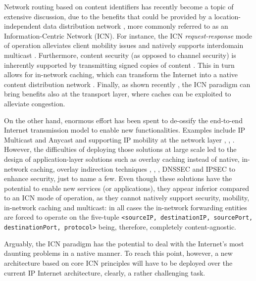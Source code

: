 \documentclass{sig-alternate}
\begin{document}
Network routing based on content identifiers has recently become a topic of extensive discussion, due to the benefits that could be provided by a location-independent data distribution network \cite{surveyICN}, more commonly referred to as an Information-Centric Network (ICN).
For instance, the ICN \textit{request-response} mode of operation alleviates client mobility issues \cite{garethMobility} and natively supports interdomain multicast \cite{SarelaBFInfocom}. 
Furthermore, content security (as opposed to channel security) is inherently supported by transmitting signed copies of content \cite{ccn}.
This in turn allows for in-network caching, which can transform the Internet into a native content distribution network \cite{cachingSurvey}.
Finally, as shown recently \cite{inrpp-hotnets-ipsaras}, the ICN paradigm can bring benefits also at the transport layer, where caches can be exploited to alleviate congestion.

On the other hand, enormous effort has been spent to de-ossify the end-to-end Internet transmission model to enable new functionalities.
Examples include IP Multicast and Anycast and supporting IP mobility at the network layer \cite{multicast}, \cite{ip-anycast-sigcomm}, \cite{mobileip}.
However, the difficulties of deploying those solutions at large scale led to the design of application-layer solutions such as overlay caching instead of native, in-network caching, overlay indirection techniques \cite{stoica-i3}, \cite{http-narrow-waist}, \cite{multicache}, DNSSEC and IPSEC to enhance security, just to name a few.
Even though these solutions have the potential to enable new services (or applications), they appear inferior compared to an ICN mode of operation, as they cannot natively support security, mobility, in-network caching and multicast: in all cases the in-network forwarding entities are forced to operate on the five-tuple \texttt{<sourceIP, destinationIP, sourcePort,  destinationPort, protocol>} being, therefore, completely content-agnostic.


Arguably, the ICN paradigm has the potential to deal with the Internet's most daunting problems in a native manner.
To reach this point, however, a new architecture based on core ICN principles will have to be deployed over the current IP Internet architecture, clearly, a rather challenging task.
\end{document}
